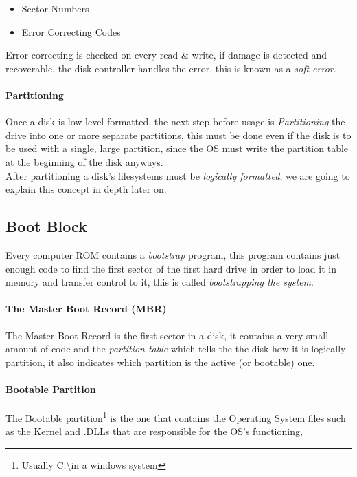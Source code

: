 \documentclass[openright, twoside]{report}
\theoremstyle{definition}
\theoremstyle{example}
\begin{document}
\begin{itemize}
	\item Sector Numbers 
	\item Error Correcting Codes
\end{itemize}

Error correcting is checked on every read \& write, if damage is detected and recoverable, the 
disk controller handles the error, this is known as a \emph{soft error}.

\paragraph{Partitioning}
Once a disk is low-level formatted, the next step before usage is \emph{Partitioning} the drive 
into one or more separate partitions, this must be done even if the disk is to be used 
with a single, large partition, since the OS must write the partition table at the beginning 
of the disk anyways.\\

After partitioning a disk's filesystems must be \emph{logically formatted}, we are going to 
explain this concept in depth later on. 

\subsection{Boot Block}
Every computer ROM contains a \emph{bootstrap} program, this program 
contains just enough code to find the first sector of the first hard 
drive in order to load it in memory and transfer control to it, this is 
called \emph{bootstrapping the system}.

\paragraph{The Master Boot Record (MBR)}
The Master Boot Record is the first sector in a disk, it contains 
a very small amount of code and the \emph{partition table} which 
tells the the disk how it is logically partition, it also indicates 
which partition is the active (or bootable) one.

\paragraph{Bootable Partition}
The Bootable partition\footnote{Usually C:\textbackslash in a windows system} 
is the one that contains the Operating System files such as the 
Kernel and .DLLs that are responsible for the OS's functioning,
\end{document}
